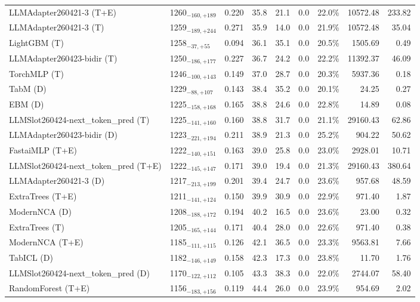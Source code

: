 \begin{tabular}{llcccccrr}
LLMAdapter260421-3 (T+E) & 1260${}_{-160,+189}$ & 0.220 & 35.8 & 21.1 & 0.0 & 22.0\% & 10572.48 & 233.82 \\
LLMAdapter260421-3 (T) & 1259${}_{-189,+244}$ & 0.271 & 35.9 & 14.0 & 0.0 & 21.9\% & 10572.48 & 35.04 \\
LightGBM (T) & 1258${}_{-37,+55}$ & 0.094 & 36.1 & 35.1 & 0.0 & 20.5\% & 1505.69 & 0.49 \\
LLMAdapter260423-bidir (T) & 1250${}_{-186,+177}$ & 0.227 & 36.7 & 24.2 & 0.0 & 22.2\% & 11392.37 & 46.09 \\
TorchMLP (T) & 1246${}_{-100,+143}$ & 0.149 & 37.0 & 28.7 & 0.0 & 20.3\% & 5937.36 & 0.18 \\
TabM (D) & 1229${}_{-88,+107}$ & 0.143 & 38.4 & 35.2 & 0.0 & 20.1\% & 24.25 & 0.27 \\
EBM (D) & 1225${}_{-158,+168}$ & 0.165 & 38.8 & 24.6 & 0.0 & 22.8\% & 14.89 & 0.08 \\
LLMSlot260424-next_token_pred (T) & 1225${}_{-141,+160}$ & 0.160 & 38.8 & 31.7 & 0.0 & 21.1\% & 29160.43 & 62.86 \\
LLMAdapter260423-bidir (D) & 1223${}_{-221,+194}$ & 0.211 & 38.9 & 21.3 & 0.0 & 25.2\% & 904.22 & 50.62 \\
FastaiMLP (T+E) & 1222${}_{-140,+151}$ & 0.163 & 39.0 & 25.8 & 0.0 & 23.0\% & 2928.01 & 10.71 \\
LLMSlot260424-next_token_pred (T+E) & 1222${}_{-145,+147}$ & 0.171 & 39.0 & 19.4 & 0.0 & 21.3\% & 29160.43 & 380.64 \\
LLMAdapter260421-3 (D) & 1217${}_{-213,+199}$ & 0.201 & 39.4 & 24.7 & 0.0 & 23.6\% & 957.68 & 48.59 \\
ExtraTrees (T+E) & 1211${}_{-141,+124}$ & 0.150 & 39.9 & 30.9 & 0.0 & 22.9\% & 971.40 & 1.87 \\
ModernNCA (D) & 1208${}_{-188,+172}$ & 0.194 & 40.2 & 16.5 & 0.0 & 23.6\% & 23.00 & 0.32 \\
ExtraTrees (T) & 1205${}_{-165,+144}$ & 0.171 & 40.4 & 28.0 & 0.0 & 22.6\% & 971.40 & 0.38 \\
ModernNCA (T+E) & 1185${}_{-111,+115}$ & 0.126 & 42.1 & 36.5 & 0.0 & 23.3\% & 9563.81 & 7.66 \\
TabICL (D) & 1182${}_{-146,+149}$ & 0.158 & 42.3 & 17.3 & 0.0 & 23.8\% & 11.70 & 1.76 \\
LLMSlot260424-next_token_pred (D) & 1170${}_{-122,+112}$ & 0.105 & 43.3 & 38.3 & 0.0 & 22.0\% & 2744.07 & 58.40 \\
RandomForest (T+E) & 1156${}_{-183,+156}$ & 0.119 & 44.4 & 26.0 & 0.0 & 23.9\% & 954.69 & 2.02 \\

\end{tabular}
